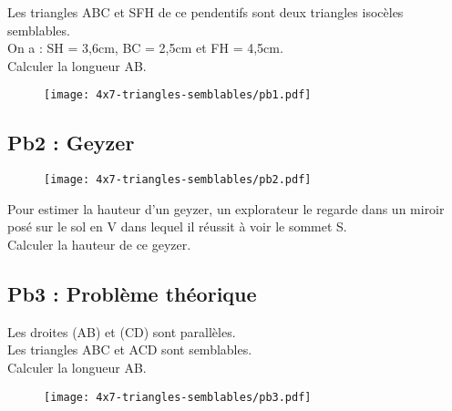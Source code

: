 \begin{multicols}{2}
Les triangles ABC et SFH de ce pendentifs sont deux triangles isocèles semblables. \\ 

On a : SH = 3,6cm, BC = 2,5cm et FH = 4,5cm. \\ 
Calculer la longueur AB.

\begin{figure}[H]
  \centering
  \texttt{[image: 4x7-triangles-semblables/pb1.pdf]}
\end{figure}

\end{multicols} 

\subsection*{Pb2 : Geyzer}

\begin{figure}[H]
  \centering
  \texttt{[image: 4x7-triangles-semblables/pb2.pdf]}
\end{figure}

Pour estimer la hauteur d'un geyzer, un explorateur le regarde dans un miroir posé sur le sol en V dans lequel il réussit à voir le sommet S. \\

Calculer la hauteur de ce geyzer.

\subsection*{Pb3 : Problème théorique}

\begin{multicols}{2}

  Les droites (AB) et (CD) sont parallèles. \\
  
  Les triangles ABC et ACD sont semblables. \\

  Calculer la longueur AB. 

\begin{figure}[H]
  \centering
  \texttt{[image: 4x7-triangles-semblables/pb3.pdf]}
\end{figure}

\end{multicols} 


